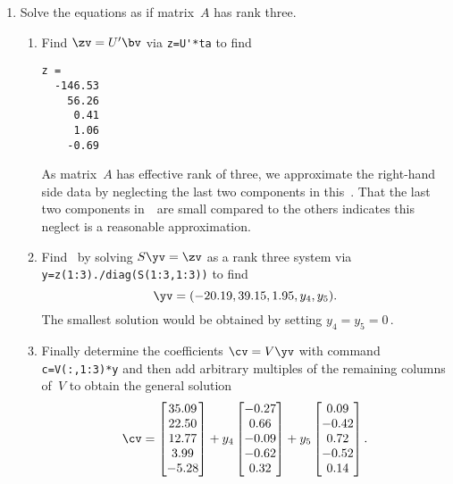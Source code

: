 \begin{example}
\begin{solution}
\begin{enumerate}
\item Solve the equations as if matrix~\(A\) has rank three.
\begin{enumerate}
\item Find \(\zv=U'\bv\) via \verb|z=U'*ta| to find
\begin{verbatim}
z =
  -146.53
    56.26
     0.41
     1.06
    -0.69
\end{verbatim}
As matrix~\(A\) has effective rank of three, we approximate the right-hand side data by neglecting the last two components in this~\zv.
That the last two components in~\zv\ are small compared to the others indicates this neglect is a reasonable approximation.

\item Find \yv\ by solving \(S\yv=\zv\) as a rank three system via \verb|y=z(1:3)./diag(S(1:3,1:3))| to find  \twodp
\begin{equation*}
\yv=(-20.19,39.15,1.95,y_4,y_5).
\end{equation*}
The smallest solution would be obtained by setting \(y_4=y_5=0\)\,.

\item Finally determine the coefficients \(\cv=V\yv\) with command \verb|c=V(:,1:3)*y| and then add arbitrary multiples of the remaining columns of~\(V\) to obtain the general solution \twodp
\begin{equation*}
\cv=
\begin{bmatrix} 35.09 \\22.50 \\12.77 \\3.99 \\-5.28 \end{bmatrix}
+y_4\begin{bmatrix} -0.27
\\0.66
\\-0.09
\\-0.62
\\0.32 \end{bmatrix}
+y_5\begin{bmatrix} 0.09
\\-0.42
\\0.72
\\-0.52
\\0.14 \end{bmatrix}.
\end{equation*}
\end{enumerate}


\end{enumerate}
\end{solution}
\end{example}
